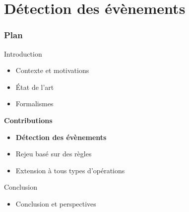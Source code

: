 \documentclass[aspectratio=1610]{beamer}
\begin{document}
\section[Évènements]{Détection des évènements}
\begin{frame}
	\frametitle{Plan}
	\centering
	\begin{minipage}{\textwidth}
    \raggedright
  \begin{minipage}{.55\textwidth}
		\begin{mytocblock}{Introduction}
			\begin{itemize}
				\item[] Contexte et motivations
				\item[] État de l'art
				\item[] Formalismes
			\end{itemize}
		\end{mytocblock}
  \end{minipage}

  \vspace{1em}

  \begin{minipage}{.55\textwidth}
    \begin{mytocblock}{\textbf{Contributions}}
			\begin{itemize}
				\item[] \textbf{Détection des évènements}
				\item[] Rejeu basé sur des règles
				\item[] Extension à tous types d'opérations
			\end{itemize}
		\end{mytocblock}
  \end{minipage}

  \vspace{1em}

  \begin{minipage}{.55\textwidth}
    \begin{mytocblock}{Conclusion}
			\begin{itemize}
				\item[] Conclusion et perspectives
			\end{itemize}
		\end{mytocblock}
  \end{minipage}
\end{minipage}
\end{frame}

\end{document}
